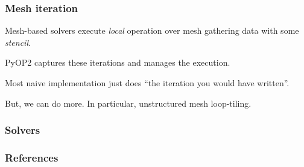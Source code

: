 \documentclass[presentation]{beamer}
\begin{document}
\begin{frame}
  \frametitle{Mesh iteration}
  Mesh-based solvers execute \emph{local} operation over mesh
  gathering data with some \emph{stencil}.

  PyOP2 captures these iterations and manages the execution.

  Most naive implementation just does ``the iteration you would have
  written''.

  But, we can do more.  In particular, unstructured mesh loop-tiling.
\end{frame}

\begin{frame}
  \frametitle{Solvers}
  
\end{frame}
\appendix
\begin{frame}
  \frametitle{References}
  \printbibliography[heading=none]
\end{frame}
\end{document}
